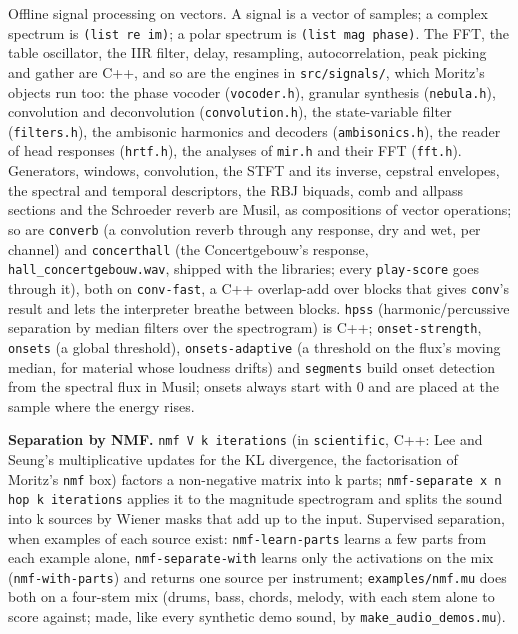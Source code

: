 \documentclass[11pt,a4paper]{article}
\newcommand{\musil}[1]{\lstinline[style=musilinline]{#1}}
\begin{document}
Offline signal processing on vectors. A signal is a vector of samples; a complex
spectrum is \musil{(list re im)}; a polar spectrum is \musil{(list mag phase)}. The FFT,
the table oscillator, the IIR filter, delay, resampling, autocorrelation, peak
picking and gather are C++, and so are the engines in \texttt{src/signals/}, which
Moritz's objects run too: the phase vocoder (\texttt{vocoder.h}), granular synthesis
(\texttt{nebula.h}), convolution and deconvolution (\texttt{convolution.h}), the
state-variable filter (\texttt{filters.h}), the ambisonic harmonics and decoders
(\texttt{ambisonics.h}), the reader of head responses (\texttt{hrtf.h}), the analyses of
\texttt{mir.h} and their FFT (\texttt{fft.h}). Generators, windows, convolution, the STFT and its
inverse, cepstral envelopes, the spectral and temporal descriptors,
the RBJ biquads, comb and allpass sections and the Schroeder reverb are Musil, as
compositions of vector operations; so are \musil{converb} (a convolution reverb through
any response, dry and wet, per channel) and \musil{concerthall} (the Concertgebouw's
response, \texttt{hall\_concertgebouw.wav}, shipped with the libraries; every
\musil{play-score} goes through it), both on \musil{conv-fast}, a C++ overlap-add over
blocks that gives \musil{conv}'s result and lets the interpreter breathe between blocks. \musil{hpss} (harmonic/percussive separation by median
filters over the spectrogram) is C++; \musil{onset-strength}, \musil{onsets} (a global
threshold), \musil{onsets-adaptive} (a threshold on the flux's moving median, for
material whose loudness drifts) and \musil{segments} build onset detection from the
spectral flux in Musil; onsets always start with 0 and are placed at the sample where
the energy rises.

\textbf{Separation by NMF.} \musil{nmf V k iterations} (in \texttt{scientific}, C++:
Lee and Seung's multiplicative updates for the KL divergence, the factorisation of Moritz's
\texttt{nmf} box) factors a non-negative matrix into k parts; \musil{nmf-separate x n hop k
iterations} applies it to the magnitude spectrogram and splits the sound into k sources by
Wiener masks that add up to the input. Supervised separation, when examples of each source
exist: \musil{nmf-learn-parts} learns a few parts from each example alone,
\musil{nmf-separate-with} learns only the activations on the mix (\musil{nmf-with-parts})
and returns one source per instrument; \texttt{examples/nmf.mu} does both on a four-stem
mix (drums, bass, chords, melody, with each stem alone to score against; made, like every
synthetic demo sound, by \texttt{make\_audio\_demos.mu}).
\end{document}
